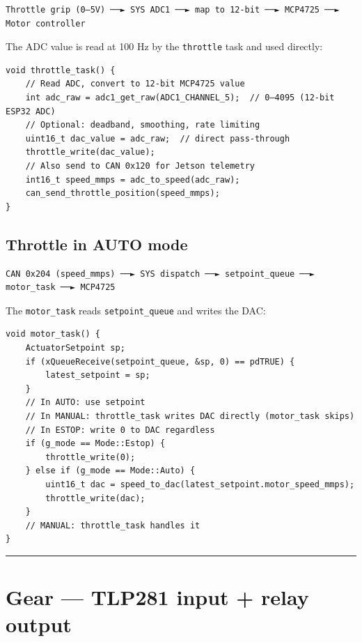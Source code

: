 \documentclass[12pt,a4paper,oneside]{report}
\begin{document}
\begin{verbatim}
Throttle grip (0–5V) ──► SYS ADC1 ──► map to 12-bit ──► MCP4725 ──► Motor controller
\end{verbatim}

The ADC value is read at 100 Hz by the \texttt{throttle} task and used directly:

\begin{verbatim}
void throttle_task() {
    // Read ADC, convert to 12-bit MCP4725 value
    int adc_raw = adc1_get_raw(ADC1_CHANNEL_5);  // 0–4095 (12-bit ESP32 ADC)
    // Optional: deadband, smoothing, rate limiting
    uint16_t dac_value = adc_raw;  // direct pass-through
    throttle_write(dac_value);
    // Also send to CAN 0x120 for Jetson telemetry
    int16_t speed_mmps = adc_to_speed(adc_raw);
    can_send_throttle_position(speed_mmps);
}
\end{verbatim}

\subsection{Throttle in AUTO mode}\label{throttle-in-auto-mode}

\begin{verbatim}
CAN 0x204 (speed_mmps) ──► SYS dispatch ──► setpoint_queue ──► motor_task ──► MCP4725
\end{verbatim}

The \texttt{motor\_task} reads \texttt{setpoint\_queue} and writes the DAC:

\begin{verbatim}
void motor_task() {
    ActuatorSetpoint sp;
    if (xQueueReceive(setpoint_queue, &sp, 0) == pdTRUE) {
        latest_setpoint = sp;
    }
    // In AUTO: use setpoint
    // In MANUAL: throttle_task writes DAC directly (motor_task skips)
    // In ESTOP: write 0 to DAC regardless
    if (g_mode == Mode::Estop) {
        throttle_write(0);
    } else if (g_mode == Mode::Auto) {
        uint16_t dac = speed_to_dac(latest_setpoint.motor_speed_mmps);
        throttle_write(dac);
    }
    // MANUAL: throttle_task handles it
}
\end{verbatim}

\begin{center}\rule{0.5\linewidth}{0.5pt}\end{center}

\section{Gear --- TLP281 input + relay
output}\label{gear-tlp281-input-relay-output}
\end{document}
